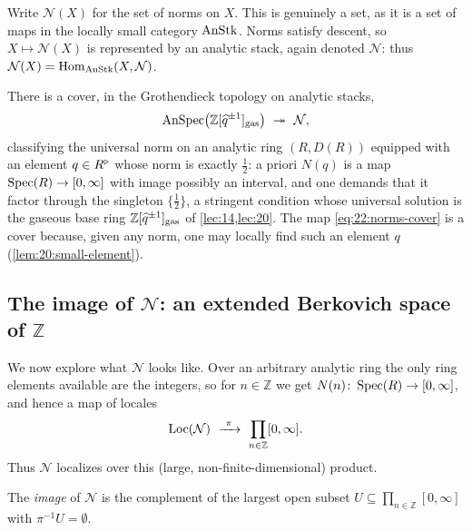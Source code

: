 \begin{notation}
\label{not:22:stack-of-norms}
Write $\mathcal N(X)$ for the set of norms on $X$. This is genuinely a set, as it
is a set of maps in the locally small category $\operatorname{AnStk}$. Norms satisfy descent,
so $X\mapsto\mathcal N(X)$ is represented by an analytic stack, again denoted
$\mathcal N$: thus $\mathcal N(X)=\operatorname{Hom}_{\operatorname{AnStk}}(X,\mathcal N)$.
\end{notation}

\begin{remark}
\label{rmk:22:gaseous-cover}
There is a cover, in the Grothendieck topology on analytic stacks,
\begin{equation}
\label{eq:22:norms-cover}
\AnSpec\bigl(\mathbb Z[\widehat q^{\pm1}]_\gasx\bigr)\ \twoheadrightarrow\
\mathcal N ,
\end{equation}
classifying the universal norm on an analytic ring $(R,D(R))$ equipped with an
element $q\in R^{\triangleright}$ whose norm is exactly $\tfrac12$: a priori $N(q)$ is a map
$\operatorname{Spec}(R)\to[0,\infty]$ with image possibly an interval, and one demands that it
factor through the singleton $\{\tfrac12\}$, a stringent condition whose
universal solution is the gaseous base ring $\mathbb Z[\widehat q^{\pm1}]_{\mathrm{gas}}$
of \cref{lec:14,lec:20}. The map \eqref{eq:22:norms-cover} is a cover because,
given any norm, one may locally find such an element $q$
(\cref{lem:20:small-element}).
\end{remark}

\subsection{The image of \texorpdfstring{$\mathcal N$}{N}: an extended
Berkovich space of \texorpdfstring{$\mathbb Z$}{Z}}
\label{subsec:22:image}

We now explore what $\mathcal N$ looks like. Over an arbitrary analytic ring the
only ring elements available are the integers, so for $n\in\mathbb Z$ we get
$N(n)\colon\operatorname{Spec}(R)\to[0,\infty]$, and hence a map of locales
\begin{equation*}
\Loc(\mathcal N)\ \xrightarrow{\ \pi\ }\ \prod_{n\in\mathbb Z}[0,\infty] .
\end{equation*}
Thus $\mathcal N$ localizes over this (large, non-finite-dimensional) product.

\begin{definition}[Image]
\label{def:22:image}
The \emph{image} of $\mathcal N$ is the complement of the largest open subset
$U\subseteq\prod_{n\in\mathbb Z}[0,\infty]$ with $\pi^{-1}U=\emptyset$.
\end{definition}

